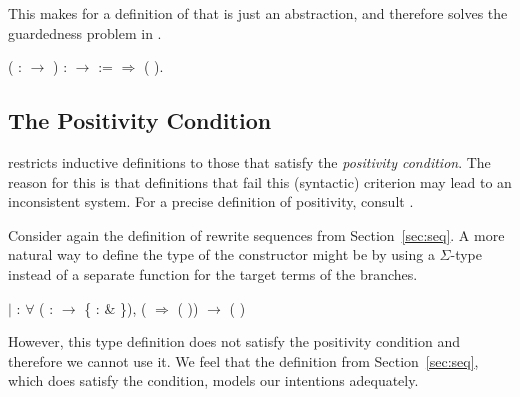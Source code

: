 This makes for a definition of 
that is just an abstraction, and therefore solves the guardedness problem in
.
\begin{singlespace}
\begin{coqdoccode}
\coqdocnoindent
{} 
  ( :
 \ensuremath{\rightarrow} ) 
:  
 \ensuremath{\rightarrow}
 
 :=\coqdoceol
\coqdocindent{1.00em}
   \ensuremath{\Rightarrow}
 ( ).\coqdoceol
\end{coqdoccode}
\end{singlespace}


\subsection{The Positivity Condition}\label{sub:positivity}

\Coq restricts inductive definitions to those that satisfy the
\emph{positivity condition}. The reason for this is that definitions
that fail this (syntactic) criterion may lead to an inconsistent
  system. For a precise definition of positivity, consult
  .

Consider again the definition of rewrite sequences from
Section~\ref{sec:seq}. A more natural way to define the type of the
 constructor might be
by using a $\Sigma$-type instead of a separate function for the target
terms of the branches.
\begin{singlespace}
\begin{coqdoccode}
\coqdocindent{1.00em}
\ensuremath{|}  :
\ensuremath{\forall}  
( :
\ensuremath{\rightarrow} \{  : 
\& 
 \}),\coqdoceol
\coqdocindent{5.00em}
(  \ensuremath{\Rightarrow}
( )) 
$\rightarrow$ (
)\coqdoceol
\end{coqdoccode}
\end{singlespace}
However, this type definition does not satisfy the positivity
condition and therefore we cannot use it. We feel that the definition
from Section~\ref{sec:seq}, which does satisfy the condition, models
our intentions adequately.


